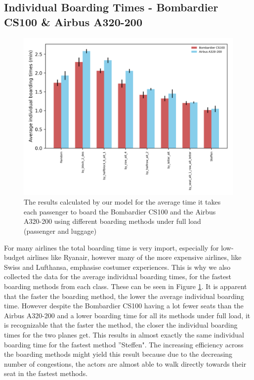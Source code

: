 \documentclass[11pt]{article}
\begin{document}
 \subsection{Individual Boarding Times - Bombardier CS100 \& Airbus A320-200}
	\begin{figure}
		\includegraphics[width=\linewidth]{../../code/AirplaneBoarding/data/figure3/figure3.png}
		\caption{The results calculated by our model for the average time it takes each passenger to board the Bombardier CS100 and the Airbus A320-200 using different boarding methods under full load (passenger and luggage)}
		\label{figure3}
	\end{figure}
	For many airlines the total boarding time is very import, especially for low-budget airlines like Ryanair, however many of the more expensive airlines, like Swiss and Lufthansa, emphasise costumer experiences. This is why we also collected the data for the average individual boarding times, for the fastest boarding methods from each class. These can be seen in Figure \ref{figure3}. It is apparent that the faster the boarding method, the lower the average individual boarding time. However despite the Bombardier CS100 having a lot fewer seats than the Airbus A320-200 and a lower boarding time for all its methods under full load, it is recognizable that the faster the method, the closer the individual boarding times for the two planes get. This results in almost exactly the same individual boarding time for the fastest method ''Steffen". The increasing efficiency across the boarding methods might yield this result because due to the decreasing number of congestions, the actors are almost able to walk directly towards their seat in the fastest methods.
	
\end{document}
